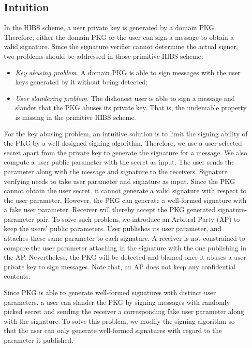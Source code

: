 \documentclass[times]{secauth}
\theoremstyle{definition}
\theoremstyle{remark}
\begin{document}
\subsection{Intuition}
In the HIBS scheme, a user private key is generated by a domain PKG. 
Therefore, either the domain PKG or the user can sign a message to obtain a valid signature. 
Since the signature verifier cannot determine the actual signer, two problems should be addressed in those primitive HIBS scheme:
\begin{itemize}
\item \emph{Key abusing problem}. A domain PKG is able to sign messages with the user keys generated by it without being detected;
\item \emph{User slandering problem}. The dishonest user is able to sign a message and slander that the PKG abuses its private key. That is, the undeniable property is missing in the primitive HIBS scheme. 
\end{itemize}
\par 
For the key abusing problem, an intuitive solution is to limit the signing ability of the PKG by a well designed signing algorithm.
Therefore, we use a user-selected secret apart from the private key to generate the signature for a message. 
We also compute a user public parameter with the secret as input.
The user sends the parameter along with the message and signature to the receivers. 
Signature verifying needs to take user parameter and signature as input. 
Since the PKG cannot obtain the user secret, it cannot generate a valid signature with respect to the user parameter. 
However, the PKG can generate a well-formed signature with a fake user parameter. 
Receiver will thereby accept the PKG generated signature-parameter pair. 
To solve such problem, we introduce an Arbitral Party (AP) to keep the users' public parameters.
User publishes its user parameter, and attaches these same parameter to each signature.
A receiver is not constrained to compare the user parameter attaching in the signature with the one publishing in the AP.
Nevertheless, the PKG will be detected and blamed once it abuses a user private key to sign messages. 
Note that, an AP does not keep any confidential contents.
\par
Since PKG is able to generate well-formed signatures with distinct user parameters, a user can slander the PKG by signing messages with randomly picked secret and sending the receiver a corresponding fake user parameter along with the signature. 
To solve this problem, we modify the signing algorithm so that the user can only generate well-formed signatures with regard to the parameter it published. 
\end{document}
